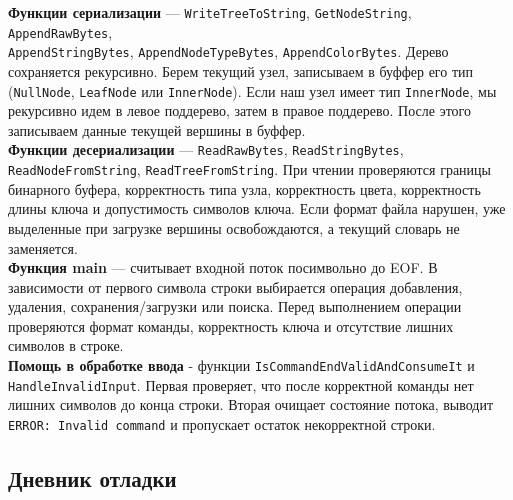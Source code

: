 \documentclass[12pt]{article}
\begin{document}
\textbf{Функции сериализации} — \texttt{WriteTreeToString}, \texttt{GetNodeString}, \texttt{AppendRawBytes}, \\ \texttt{AppendStringBytes}, \texttt{AppendNodeTypeBytes}, \texttt{AppendColorBytes}. Дерево сохраняется рекурсивно. Берем текущий узел, записываем в буффер его тип (\texttt{NullNode}, \texttt{LeafNode} или \texttt{InnerNode}). Если наш узел имеет тип \texttt{InnerNode}, мы рекурсивно идем в левое поддерево, затем в правое поддерево. После этого записываем данные текущей вершины в буффер. \\

\textbf{Функции десериализации} — \texttt{ReadRawBytes}, \texttt{ReadStringBytes}, \texttt{ReadNodeFromString}, \texttt{ReadTreeFromString}. При чтении проверяются границы бинарного буфера, корректность типа узла, корректность цвета, корректность длины ключа и допустимость символов ключа. Если формат файла нарушен, уже выделенные при загрузке вершины освобождаются, а текущий словарь не заменяется. \\

\textbf{Функция main} — считывает входной поток посимвольно до EOF. В зависимости от первого символа строки выбирается операция добавления, удаления, сохранения/загрузки или поиска. Перед выполнением операции проверяются формат команды, корректность ключа и отсутствие лишних символов в строке. \\

\textbf{Помощь в обработке ввода} - функции \texttt{IsCommandEndValidAndConsumeIt} и \\ \texttt{HandleInvalidInput}. Первая проверяет, что после корректной команды нет лишних символов до конца строки. Вторая очищает состояние потока, выводит \texttt{ERROR: Invalid command} и пропускает остаток некорректной строки. \\

\subsection*{Дневник отладки}
\end{document}
